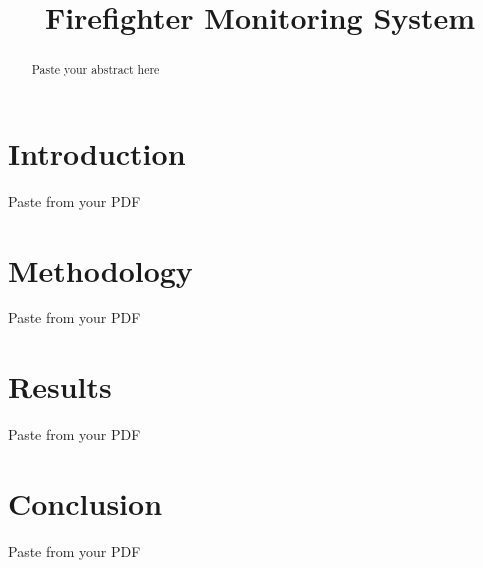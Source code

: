 \documentclass[conference]{IEEEtran}
\begin{document}
	
	\title{Firefighter Monitoring System}
	
	\author{
	}
	
	\maketitle
	
	\begin{abstract}
		Paste your abstract here
	\end{abstract}
	
	\section{Introduction}
	Paste from your PDF
	
	\section{Methodology}
	Paste from your PDF
	
	\section{Results}
	Paste from your PDF
	
	\section{Conclusion}
	Paste from your PDF
	
\end{document}
